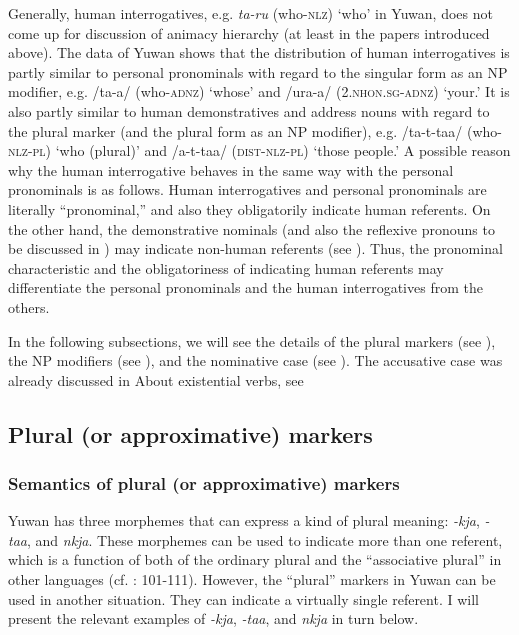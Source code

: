 Generally, human interrogatives, e.g. \textit{ta-ru} (who-\textsc{nlz}) ‘who’ in Yuwan, does not come up for discussion of animacy hierarchy (at least in the papers introduced above). The data of Yuwan shows that the distribution of human interrogatives is partly similar to personal pronominals with regard to the singular form as an NP modifier, e.g. /ta-a/ (who-\textsc{adnz}) ‘whose’ and /ura-a/ (2.\textsc{nhon}.\textsc{sg}-\textsc{adnz}) ‘your.’ It is also partly similar to human demonstratives and address nouns with regard to the plural marker (and the plural form as an NP modifier), e.g. /ta-t-taa/ (who-\textsc{nlz}-\textsc{pl}) ‘who (plural)’ and /a-t-taa/ (\textsc{dist}-\textsc{nlz}-\textsc{pl}) ‘those people.’ A possible reason why the human interrogative behaves in the same way with the personal pronominals is as follows. Human interrogatives and personal pronominals are literally “pronominal,” and also they obligatorily indicate human referents. On the other hand, the demonstrative nominals (and also the reflexive pronouns to be discussed in ) may indicate non-human referents (see ). Thus, the pronominal characteristic and the obligatoriness of indicating human referents may differentiate the personal pronominals and the human interrogatives from the others.

In the following subsections, we will see the details of the plural markers (see ), the NP modifiers (see ), and the nominative case (see ). The accusative case was already discussed in  About existential verbs, see 

\subsection{Plural (or approximative) markers}
\subsubsection{Semantics of plural (or approximative) markers}

Yuwan has three morphemes that can express a kind of plural meaning: \textit{-kja}, \textit{-taa}, and \textit{nkja}. These morphemes can be used to indicate more than one referent, which is a function of both of the ordinary plural and the “associative plural” in other languages (cf. \citealt{Corbett2000}: 101-111). However, the “plural” markers in Yuwan can be used in another situation. They can indicate a virtually single referent. I will present the relevant examples of \textit{-kja}, \textit{-taa}, and \textit{nkja} in turn below.

